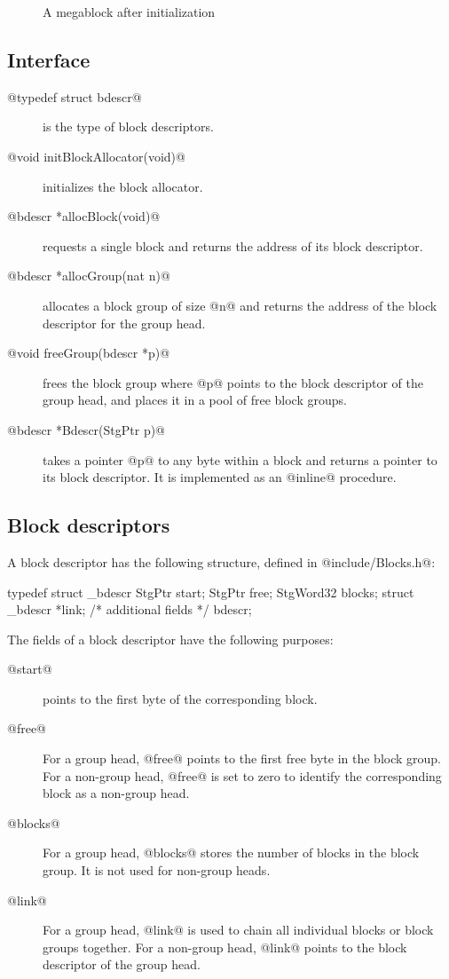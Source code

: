 \documentclass{article}
\begin{document}
\begin{figure}[ht]
\begin{center}

\caption{A megablock after initialization}
\label{fig-megablock}
\end{center}
\end{figure}

\subsection{Interface}

\begin{description}
\item[@typedef struct bdescr@] is the type of block descriptors.
\item[@void initBlockAllocator(void)@] initializes the block allocator. 
\item[@bdescr *allocBlock(void)@] requests a single block and returns 
the address of its block descriptor. 
\item[@bdescr *allocGroup(nat n)@] allocates a block group of size @n@ 
and returns the address of the block descriptor for the group head.
\item[@void freeGroup(bdescr *p)@] frees the block group where @p@ points
to the block descriptor of the group head, and places it in a pool of
free block groups. 
\item[@bdescr *Bdescr(StgPtr p)@] takes a pointer @p@ to any byte within
a block and returns a pointer to its block descriptor. It is implemented as
an @inline@ procedure.
\end{description}

\subsection{Block descriptors}

A block descriptor has the following structure, defined in 
@include/Blocks.h@:

\begin{code}
typedef struct _bdescr {
  StgPtr          start;
  StgPtr          free; 
  StgWord32       blocks;
  struct _bdescr  *link;
  /* additional fields */
} bdescr;
\end{code}

The fields of a block descriptor have the following purposes:

\begin{description}
\item[@start@] points to the first byte of the corresponding block.
\item[@free@] For a group head, @free@ points to the first free byte in 
the block group. For a non-group head, @free@ is set to zero to identify
the corresponding block as a non-group head.
\item[@blocks@] For a group head, @blocks@ stores the number of blocks
in the block group. It is not used for non-group heads.
\item[@link@] For a group head, @link@ is used to chain all individual 
blocks or block groups together. For a non-group head, @link@ points
to the block descriptor of the group head.
\end{description}
\end{document}
